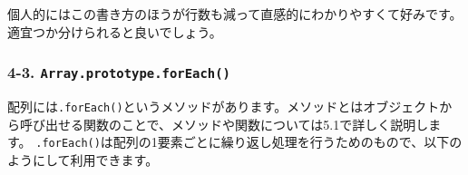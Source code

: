 \begin{Shaded}
\begin{Highlighting}[]
  \OperatorTok{=}\NormalTok{ []}\OperatorTok{;}
  \NormalTok{ (}\OperatorTok{=} \OperatorTok{;}\OperatorTok{\textless{}=} \OperatorTok{;}\OperatorTok{++}\NormalTok{) \{}
     \OperatorTok{\textless{}} \NormalTok{) \{}
\NormalTok{(}\NormalTok{)}\OperatorTok{;}
\NormalTok{    \} }\NormalTok{ \{}
\NormalTok{(}\OperatorTok{{-}}\NormalTok{) }\OperatorTok{+}\NormalTok{(}\OperatorTok{{-}}\NormalTok{))}\OperatorTok{;}
\NormalTok{    \}}
\NormalTok{  \}}
  \OperatorTok{;}
\end{Highlighting}
\end{Shaded}

個人的にはこの書き方のほうが行数も減って直感的にわかりやすくて好みです。適宜つか分けられると良いでしょう。

\subsubsection{\texorpdfstring{4-3.
\texttt{Array.prototype.forEach()}}{4-3. Array.prototype.forEach()}}\label{array.prototype.foreach}

配列には\texttt{.forEach()}というメソッドがあります。メソッドとはオブジェクトから呼び出せる関数のことで、メソッドや関数については5.1で詳しく説明します。
\texttt{.forEach()}は配列の1要素ごとに繰り返し処理を行うためのもので、以下のようにして利用できます。

